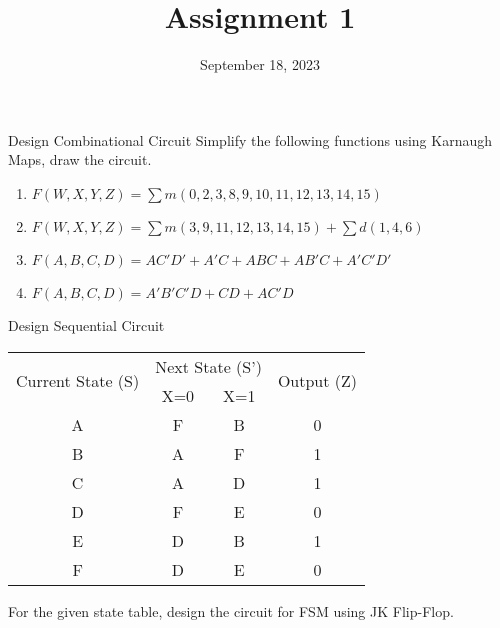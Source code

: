 \documentclass{vhdl-assignment}
\title{Assignment 1}
\date{September 18, 2023}
\begin{document}
\maketitle

\begin{problem}{Design Combinational Circuit}
    Simplify the following functions using Karnaugh Maps, draw the circuit.
    \begin{enumerate}
        \item$F(W,X,Y,Z)=\sum m(0,2,3,8,9,10,11,12,13,14,15)$
        \item$F(W,X,Y,Z)=\sum m(3,9,11,12,13,14,15) + \sum d(1,4,6)$
        \item$F(A,B,C,D)=AC'D'+A'C+ABC+AB'C+A'C'D'$
        \item$F(A,B,C,D)=A'B'C'D+CD+AC'D$
    \end{enumerate}
\end{problem}

\begin{problem}{Design Sequential Circuit}
    \begin{center}
        \begin{tabular}{|c|cc|c|}
            \hline
            \multirow{2}{*}{Current State (S)} & \multicolumn{2}{c|}{Next State (S')} & \multirow{2}{*}{Output (Z)}     \\ \cline{2-3}
                                               & \multicolumn{1}{c|}{X=0}             & X=1                         &   \\ \hline
            A                                  & \multicolumn{1}{c|}{F  }             & B                           & 0 \\ \hline
            B                                  & \multicolumn{1}{c|}{A  }             & F                           & 1 \\ \hline
            C                                  & \multicolumn{1}{c|}{A  }             & D                           & 1 \\ \hline
            D                                  & \multicolumn{1}{c|}{F  }             & E                           & 0 \\ \hline
            E                                  & \multicolumn{1}{c|}{D  }             & B                           & 1 \\ \hline
            F                                  & \multicolumn{1}{c|}{D  }             & E                           & 0 \\ \hline
        \end{tabular}
    \end{center}
    
    For the given state table, design the circuit for FSM using JK Flip-Flop.
\end{problem}
\end{document}

